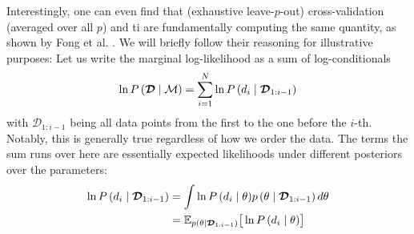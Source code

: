 \documentclass[\relativeRoot/main.tex]{subfiles}
\begin{document}
Interestingly, one can even find that (exhaustive leave-$p$-out) cross-validation (averaged over all $p$) and \gls{ti} are fundamentally computing the same quantity, as shown by Fong et al. \cite{fong_marginal_2019}. We will briefly follow their reasoning for illustrative purposes: Let us write the marginal log-likelihood as a sum of log-conditionals
%
\begin{equation} \label{eq:evidence_as_sequence}
    \ln{P \left( \boldsymbol{\mathcal{D}} \mid \mathcal{M} \right)} = \sum_{i=1}^N{ \ln{ P \left( d_i \mid \boldsymbol{\mathcal{D}}_{1:i-1} \right) } }
\end{equation}
%
with $\boldsymbol{\mathcal{D}}_{1:i-1}$ being all data points from the first to the one before the $i$-th. Notably, this is generally true regardless of how we order the data. The terms the sum runs over here are essentially expected likelihoods under different posteriors over the parameters:
%
\begin{equation}
    \begin{aligned}
        \ln{ P \left( d_i \mid \boldsymbol{\mathcal{D}}_{1:i-1} \right) } &= \int{ \ln{ P \left( d_i \mid \theta \right) } p \left( \theta \mid \boldsymbol{\mathcal{D}}_{1:i-1} \right) d\theta} \\
        &= \mathbb{E}_{p \left( \theta \mid \boldsymbol{\mathcal{D}}_{1:i-1} \right)} \big[ \ln{ P \left( d_i \mid \theta \right) } \big]
    \end{aligned}
\end{equation}
%
\end{document}
